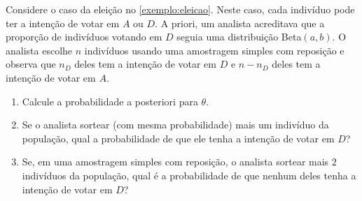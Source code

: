 \begin{exercise}
 \label{exercise:predictive_1}
 Considere o caso da eleição no \cref{exemplo:eleicao}.
 Neste caso, cada indivíduo pode ter a
 intenção de votar em $A$ ou $D$.
 A priori, um analista acreditava que 
 a proporção de indivíduos votando em $D$
 seguia uma distribuição Beta$(a,b)$.
 O analista escolhe $n$ indivíduos usando uma 
 amostragem simples com reposição e
 observa que $n_{D}$ deles tem 
 a intenção de votar em $D$ e
 $n-n_{D}$ deles tem a intenção de votar em $A$.
 \begin{enumerate}[label=(\alph*)]
  \item Calcule a probabilidade a posteriori para $\theta$.
  \item Se o analista sortear (com mesma probabilidade)
  mais um indivíduo da população, qual a
  probabilidade de que ele tenha a 
  intenção de votar em $D$?
  \item Se, em uma amostragem simples com reposição, o 
  analista sortear mais $2$ indivíduos da população, qual é 
  a probabilidade de que nenhum deles tenha
  a intenção de votar em $D$?
 \end{enumerate}
\end{exercise}

